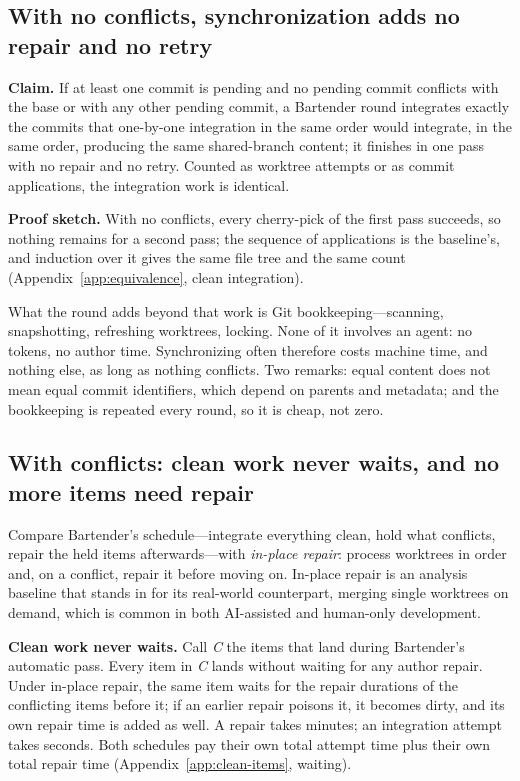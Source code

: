 \documentclass[pdflatex,sn-mathphys-ay]{sn-jnl}
\theoremstyle{thmstyleone}
\theoremstyle{thmstylethree}
\begin{document}
\subsection{With no conflicts, synchronization adds no repair and no retry}\label{sec:no-conflicts}

\textbf{Claim.} If at least one commit is pending and no pending commit conflicts with the base or with any other pending commit, a Bartender round integrates exactly the commits that one-by-one integration in the same order would integrate, in the same order, producing the same shared-branch content; it finishes in one pass with no repair and no retry. Counted as worktree attempts or as commit applications, the integration work is identical.

\textbf{Proof sketch.} With no conflicts, every cherry-pick of the first pass succeeds, so nothing remains for a second pass; the sequence of applications is the baseline's, and induction over it gives the same file tree and the same count (Appendix~\ref{app:equivalence}, clean integration).

What the round adds beyond that work is Git bookkeeping---scanning, snapshotting, refreshing worktrees, locking. None of it involves an agent: no tokens, no author time. Synchronizing often therefore costs machine time, and nothing else, as long as nothing conflicts. Two remarks: equal content does not mean equal commit identifiers, which depend on parents and metadata; and the bookkeeping is repeated every round, so it is cheap, not zero.

\subsection{With conflicts: clean work never waits, and no more items need repair}\label{sec:repair-order}

Compare Bartender's schedule---integrate everything clean, hold what conflicts, repair the held items afterwards---with \emph{in-place repair}: process worktrees in order and, on a conflict, repair it before moving on. In-place repair is an analysis baseline that stands in for its real-world counterpart, merging single worktrees on demand, which is common in both AI-assisted and human-only development.

\textbf{Clean work never waits.} Call \emph{C} the items that land during Bartender's automatic pass. Every item in \emph{C} lands without waiting for any author repair. Under in-place repair, the same item waits for the repair durations of the conflicting items before it; if an earlier repair poisons it, it becomes dirty, and its own repair time is added as well. A repair takes minutes; an integration attempt takes seconds. Both schedules pay their own total attempt time plus their own total repair time (Appendix~\ref{app:clean-items}, waiting).
\end{document}
